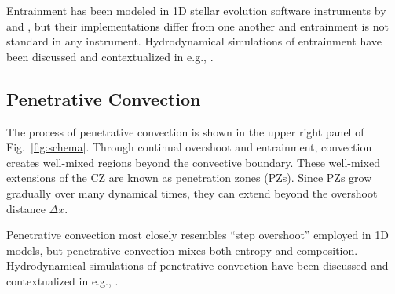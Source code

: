 Entrainment has been modeled in 1D stellar evolution software instruments by \citet{staritsin_2013} and \citet{scott_etal_2021}, but their implementations differ from one another and entrainment is not standard in any instrument.
Hydrodynamical simulations of entrainment have been discussed and contextualized in e.g., \citet{fuentes_cumming_2020}.


\subsection{Penetrative Convection}
The process of penetrative convection is shown in the upper right panel of Fig.~\ref{fig:schema}.
Through continual overshoot and entrainment, convection creates well-mixed regions beyond the convective boundary.
These well-mixed extensions of the CZ are known as penetration zones (PZs).
Since PZs grow gradually over many dynamical times, they can extend beyond the overshoot distance $\Delta x$.

Penetrative convection most closely resembles ``step overshoot'' employed in 1D models, but penetrative convection mixes both entropy and composition.
Hydrodynamical simulations of penetrative convection have been discussed and contextualized in e.g., \citet{anders_etal_2021}.
